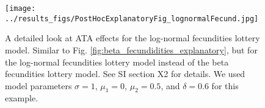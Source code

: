 \documentclass[letterpaper,11pt]{article}
\begin{document}
\begin{figure}
\texttt{[image: ../results\_figs/PostHocExplanatoryFig\_lognormalFecund.jpg]}
\caption{A detailed look at ATA effects for the log-normal fecundities lottery model.
Similar to Fig. \ref{fig:beta_fecundidities_explanatory}, but for the 
log-normal fecundities lottery model instead of the beta fecundities
lottery model. See SI section X2
for details. We used model parameters $\sigma = 1$, $\mu_1 = 0$, $\mu_2=0.5$, 
and $\delta=0.6$ for this example.}\label{fig:lognormal_fecundidities_explanatory}
\end{figure}



\end{document}

